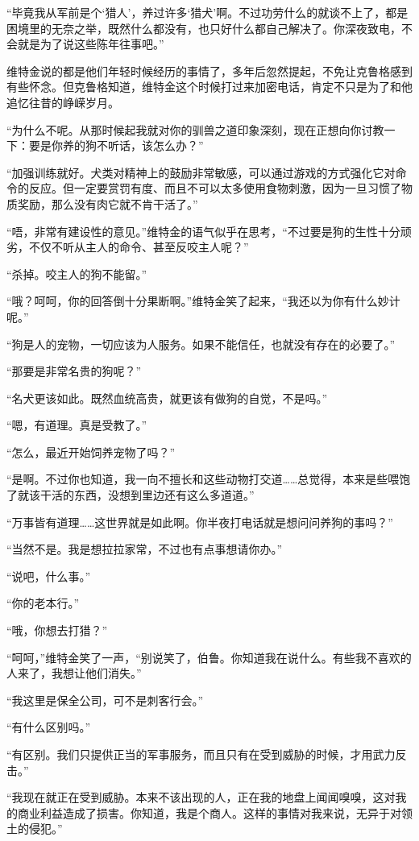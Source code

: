 “毕竟我从军前是个‘猎人’，养过许多‘猎犬’啊。不过功劳什么的就谈不上了，都是困境里的无奈之举，既然什么都没有，也只好什么都自己解决了。你深夜致电，不会就是为了说这些陈年往事吧。”

维特金说的都是他们年轻时候经历的事情了，多年后忽然提起，不免让克鲁格感到有些怀念。但克鲁格知道，维特金这个时候打过来加密电话，肯定不只是为了和他追忆往昔的峥嵘岁月。

“为什么不呢。从那时候起我就对你的驯兽之道印象深刻，现在正想向你讨教一下：要是你养的狗不听话，该怎么办？”

“加强训练就好。犬类对精神上的鼓励非常敏感，可以通过游戏的方式强化它对命令的反应。但一定要赏罚有度、而且不可以太多使用食物刺激，因为一旦习惯了物质奖励，那么没有肉它就不肯干活了。”

“唔，非常有建设性的意见。”维特金的语气似乎在思考，“不过要是狗的生性十分顽劣，不仅不听从主人的命令、甚至反咬主人呢？”

“杀掉。咬主人的狗不能留。”

“哦？呵呵，你的回答倒十分果断啊。”维特金笑了起来，“我还以为你有什么妙计呢。”

“狗是人的宠物，一切应该为人服务。如果不能信任，也就没有存在的必要了。”

“那要是非常名贵的狗呢？”

“名犬更该如此。既然血统高贵，就更该有做狗的自觉，不是吗。”

“嗯，有道理。真是受教了。”

“怎么，最近开始饲养宠物了吗？”

“是啊。不过你也知道，我一向不擅长和这些动物打交道……总觉得，本来是些喂饱了就该干活的东西，没想到里边还有这么多道道。”

“万事皆有道理……这世界就是如此啊。你半夜打电话就是想问问养狗的事吗？”

“当然不是。我是想拉拉家常，不过也有点事想请你办。”

“说吧，什么事。”

“你的老本行。”

“哦，你想去打猎？”

“呵呵，”维特金笑了一声，“别说笑了，伯鲁。你知道我在说什么。有些我不喜欢的人来了，我想让他们消失。”

“我这里是保全公司，可不是刺客行会。”

“有什么区别吗。”

“有区别。我们只提供正当的军事服务，而且只有在受到威胁的时候，才用武力反击。”

“我现在就正在受到威胁。本来不该出现的人，正在我的地盘上闻闻嗅嗅，这对我的商业利益造成了损害。你知道，我是个商人。这样的事情对我来说，无异于对领土的侵犯。”

